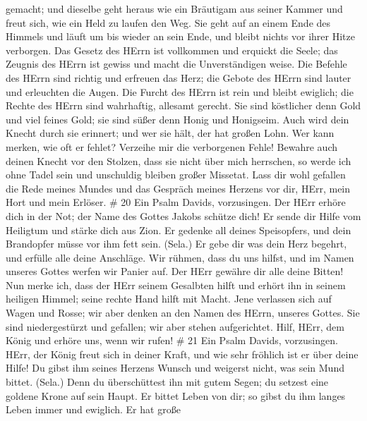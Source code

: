 gemacht;  und dieselbe geht heraus wie ein Bräutigam aus
seiner Kammer und freut sich, wie ein Held zu laufen den Weg.
 Sie geht auf an einem Ende des Himmels und läuft um bis
wieder an sein Ende, und bleibt nichts vor ihrer Hitze verborgen.
 Das Gesetz des HErrn ist vollkommen und erquickt die Seele;
das Zeugnis des HErrn ist gewiss und macht die Unverständigen weise.
 Die Befehle des HErrn sind richtig und erfreuen das Herz;
die Gebote des HErrn sind lauter und erleuchten die Augen. 
Die Furcht des HErrn ist rein und bleibt ewiglich; die Rechte des HErrn
sind wahrhaftig, allesamt gerecht.  Sie sind köstlicher
denn Gold und viel feines Gold; sie sind süßer denn Honig und Honigseim.
 Auch wird dein Knecht durch sie erinnert; und wer sie
hält, der hat großen Lohn.  Wer kann merken, wie oft er
fehlet? Verzeihe mir die verborgenen Fehle!  Bewahre auch
deinen Knecht vor den Stolzen, dass sie nicht über mich herrschen, so
werde ich ohne Tadel sein und unschuldig bleiben großer Missetat.
 Lass dir wohl gefallen die Rede meines Mundes und das
Gespräch meines Herzens vor dir, HErr, mein Hort und mein Erlöser. \# 20
 Ein Psalm Davids, vorzusingen.  Der HErr erhöre
dich in der Not; der Name des Gottes Jakobs schütze dich! 
Er sende dir Hilfe vom Heiligtum und stärke dich aus Zion. 
Er gedenke all deines Speisopfers, und dein Brandopfer müsse vor ihm
fett sein. (Sela.)  Er gebe dir was dein Herz begehrt, und
erfülle alle deine Anschläge.  Wir rühmen, dass du uns
hilfst, und im Namen unseres Gottes werfen wir Panier auf. Der HErr
gewähre dir alle deine Bitten!  Nun merke ich, dass der HErr
seinem Gesalbten hilft und erhört ihn in seinem heiligen Himmel; seine
rechte Hand hilft mit Macht.  Jene verlassen sich auf Wagen
und Rosse; wir aber denken an den Namen des HErrn, unseres Gottes.
 Sie sind niedergestürzt und gefallen; wir aber stehen
aufgerichtet.  Hilf, HErr, dem König und erhöre uns, wenn
wir rufen! \# 21  Ein Psalm Davids, vorzusingen.
 HErr, der König freut sich in deiner Kraft, und wie sehr
fröhlich ist er über deine Hilfe!  Du gibst ihm seines
Herzens Wunsch und weigerst nicht, was sein Mund bittet. (Sela.)
 Denn du überschüttest ihn mit gutem Segen; du setzest eine
goldene Krone auf sein Haupt.  Er bittet Leben von dir; so
gibst du ihm langes Leben immer und ewiglich.  Er hat große
